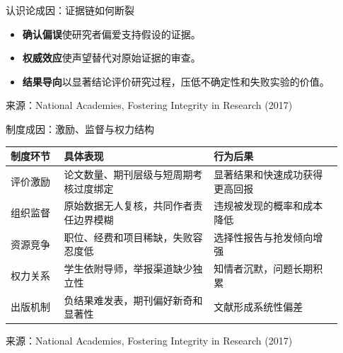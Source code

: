 \documentclass[aspectratio=169,10pt]{ctexbeamer}
\newcommand{\key}[1]{\textcolor{DeepBlue}{\textbf{#1}}}
\newcommand{\source}[1]{%
  \par\vfill\begingroup\color{Muted}\fontsize{5.8}{7}\selectfont 来源：#1\endgroup
}
\begin{document}
\begin{frame}{认识论成因：证据链如何断裂}
  \begin{center}
  \end{center}

  \vspace{0.35cm}
  \begin{itemize}
    \item \key{确认偏误}使研究者偏爱支持假设的证据。
    \item \key{权威效应}使声望替代对原始证据的审查。
    \item \key{结果导向}以显著结论评价研究过程，压低不确定性和失败实验的价值。
  \end{itemize}
  \source{National Academies, Fostering Integrity in Research (2017)}
\end{frame}

\begin{frame}{制度成因：激励、监督与权力结构}
  \small
  \begin{tabular}{@{}p{0.15\linewidth}p{0.42\linewidth}p{0.36\linewidth}@{}}
    \toprule
    \textbf{制度环节} & \textbf{具体表现} & \textbf{行为后果} \\
    \midrule
    评价激励 & 论文数量、期刊层级与短周期考核过度绑定 & 显著结果和快速成功获得更高回报 \\
    \addlinespace
    组织监督 & 原始数据无人复核，共同作者责任边界模糊 & 违规被发现的概率和成本降低 \\
    \addlinespace
    资源竞争 & 职位、经费和项目稀缺，失败容忍度低 & 选择性报告与抢发倾向增强 \\
    \addlinespace
    权力关系 & 学生依附导师，举报渠道缺少独立性 & 知情者沉默，问题长期积累 \\
    \addlinespace
    出版机制 & 负结果难发表，期刊偏好新奇和显著性 & 文献形成系统性偏差 \\
    \bottomrule
  \end{tabular}
  \source{National Academies, Fostering Integrity in Research (2017)}
\end{frame}
\end{document}
